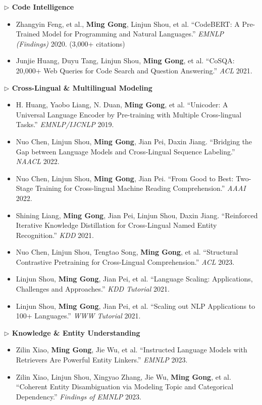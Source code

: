 \documentclass[10.5pt,letterpaper]{article}
\begin{document}
\noindent\textcolor{blue!60!black}{\textbf{$\triangleright$ Code Intelligence}}
\begin{itemize}
  \item Zhangyin Feng, et al., \textbf{Ming Gong}, Linjun Shou, et al. ``CodeBERT: A Pre-Trained Model for Programming and Natural Languages.'' \textit{EMNLP (Findings)} 2020. (3,000+ citations)
  \item Junjie Huang, Duyu Tang, Linjun Shou, \textbf{Ming Gong}, et al. ``CoSQA: 20,000+ Web Queries for Code Search and Question Answering.'' \textit{ACL} 2021.
\end{itemize}

\noindent\textcolor{blue!60!black}{\textbf{$\triangleright$ Cross-Lingual \& Multilingual Modeling}}
\begin{itemize}
  \item H. Huang, Yaobo Liang, N. Duan, \textbf{Ming Gong}, et al. ``Unicoder: A Universal Language Encoder by Pre-training with Multiple Cross-lingual Tasks.'' \textit{EMNLP/IJCNLP} 2019.
  \item Nuo Chen, Linjun Shou, \textbf{Ming Gong}, Jian Pei, Daxin Jiang. ``Bridging the Gap between Language Models and Cross-Lingual Sequence Labeling.'' \textit{NAACL} 2022.
  \item Nuo Chen, Linjun Shou, \textbf{Ming Gong}, Jian Pei. ``From Good to Best: Two-Stage Training for Cross-lingual Machine Reading Comprehension.'' \textit{AAAI} 2022.
  \item Shining Liang, \textbf{Ming Gong}, Jian Pei, Linjun Shou, Daxin Jiang. ``Reinforced Iterative Knowledge Distillation for Cross-Lingual Named Entity Recognition.'' \textit{KDD} 2021.
  \item Nuo Chen, Linjun Shou, Tengtao Song, \textbf{Ming Gong}, et al. ``Structural Contrastive Pretraining for Cross-Lingual Comprehension.'' \textit{ACL} 2023.
  \item Linjun Shou, \textbf{Ming Gong}, Jian Pei, et al. ``Language Scaling: Applications, Challenges and Approaches.'' \textit{KDD Tutorial} 2021.
  \item Linjun Shou, \textbf{Ming Gong}, Jian Pei, et al. ``Scaling out NLP Applications to 100+ Languages.'' \textit{WWW Tutorial} 2021.
\end{itemize}

\noindent\textcolor{blue!60!black}{\textbf{$\triangleright$ Knowledge \& Entity Understanding}}
\begin{itemize}
  \item Zilin Xiao, \textbf{Ming Gong}, Jie Wu, et al. ``Instructed Language Models with Retrievers Are Powerful Entity Linkers.'' \textit{EMNLP} 2023.
  \item Zilin Xiao, Linjun Shou, Xingyao Zhang, Jie Wu, \textbf{Ming Gong}, et al. ``Coherent Entity Disambiguation via Modeling Topic and Categorical Dependency.'' \textit{Findings of EMNLP} 2023.
\end{itemize}
\end{document}

